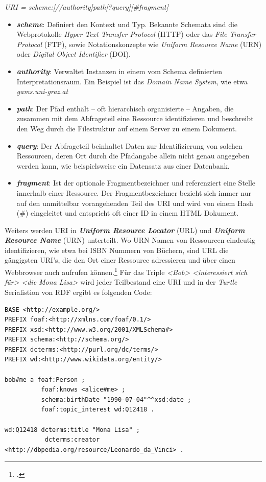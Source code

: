 \documentclass[12pt,a4paper]{article}
\begin{document}
\begin{center}
\textit{URI = scheme:[//authority]path[?query][\#fragment]}
\\
\end{center}
\begin{itemize}
\item \textbf{\textit{scheme}}: Definiert den Kontext und Typ. Bekannte Schemata sind die Webprotokolle \textit{Hyper Text Transfer Protocol} (HTTP) oder das \textit{File Transfer Protocol} (FTP), sowie Notationskonzepte wie \textit{Uniform Resource Name} (URN) oder \textit{Digital Object Identifier} (DOI).
\item \textbf{\textit{authority}}: Verwaltet Instanzen in einem vom Schema definierten Interpretationsraum. Ein Beispiel ist das \textit{Domain Name System}, wie etwa \textit{gams.uni-graz.at}
\item \textbf{\textit{path}}: Der Pfad enthält – oft hierarchisch organisierte – Angaben, die zusammen mit dem Abfrageteil eine Ressource identifizieren und beschreibt den Weg durch die Filestruktur auf einem Server zu einem Dokument.
\item \textbf{\textit{query}}: Der Abfrageteil beinhaltet Daten zur Identifizierung von solchen Ressourcen, deren Ort durch die Pfadangabe allein nicht genau angegeben werden kann, wie beispielsweise ein Datensatz aus einer Datenbank.
\item \textbf{\textit{fragment}}: Ist der optionale Fragmentbezeichner und referenziert eine Stelle innerhalb einer Ressource. Der Fragmentbezeichner bezieht sich immer nur auf den unmittelbar vorangehenden Teil des URI und wird von einem Hash (\#) eingeleitet und entspricht oft einer ID in einem HTML Dokument.
\end{itemize}

Weiters werden URI in \textbf{\textit{Uniform Resource Locator}} (URL) und \textbf{\textit{Uniform Resource Name}} (URN) unterteilt. Wo URN Namen von Ressourcen eindeutig identifizieren, wie etwa bei ISBN Nummern von Büchern, sind URL die gängigsten URI's, die den Ort einer Ressource adressieren und über einen Webbrowser auch aufrufen können.\footcite[Vgl.][S.21-22]{powers2003practical} Für das Triple \textit{<Bob>} \textit{<interessiert sich für>} \textit{<die Mona Lisa>} wird jeder Teilbestand eine URI und in der \textit{Turtle} Serialistion von RDF ergibt es folgenden Code:
\begin{lstlisting}[]
BASE <http://example.org/>
PREFIX foaf:<http://xmlns.com/foaf/0.1/>
PREFIX xsd:<http://www.w3.org/2001/XMLSchema#>
PREFIX schema:<http://schema.org/>
PREFIX dcterms:<http://purl.org/dc/terms/>
PREFIX wd:<http://www.wikidata.org/entity/>

bob#me a foaf:Person ;
          foaf:knows <alice#me> ;
          schema:birthDate "1990-07-04"^^xsd:date ;
          foaf:topic_interest wd:Q12418 .
 
wd:Q12418 dcterms:title "Mona Lisa" ;
           dcterms:creator <http://dbpedia.org/resource/Leonardo_da_Vinci> .
\end{lstlisting}
\end{document}

